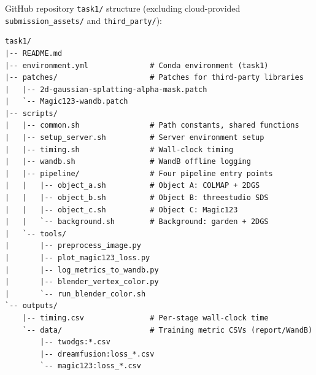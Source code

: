 \documentclass[10pt,twocolumn,letterpaper]{article}
\begin{document}
GitHub repository \texttt{task1/} structure (excluding cloud-provided \texttt{submission\_assets/} and \texttt{third\_party/}):
\begin{lstlisting}
task1/
|-- README.md
|-- environment.yml              # Conda environment (task1)
|-- patches/                     # Patches for third-party libraries
|   |-- 2d-gaussian-splatting-alpha-mask.patch
|   `-- Magic123-wandb.patch
|-- scripts/
|   |-- common.sh                # Path constants, shared functions
|   |-- setup_server.sh          # Server environment setup
|   |-- timing.sh                # Wall-clock timing
|   |-- wandb.sh                 # WandB offline logging
|   |-- pipeline/                # Four pipeline entry points
|   |   |-- object_a.sh          # Object A: COLMAP + 2DGS
|   |   |-- object_b.sh          # Object B: threestudio SDS
|   |   |-- object_c.sh          # Object C: Magic123
|   |   `-- background.sh        # Background: garden + 2DGS
|   `-- tools/
|       |-- preprocess_image.py
|       |-- plot_magic123_loss.py
|       |-- log_metrics_to_wandb.py
|       |-- blender_vertex_color.py
|       `-- run_blender_color.sh
`-- outputs/
    |-- timing.csv               # Per-stage wall-clock time
    `-- data/                    # Training metric CSVs (report/WandB)
        |-- twodgs:*.csv
        |-- dreamfusion:loss_*.csv
        `-- magic123:loss_*.csv
\end{lstlisting}
\end{document}
